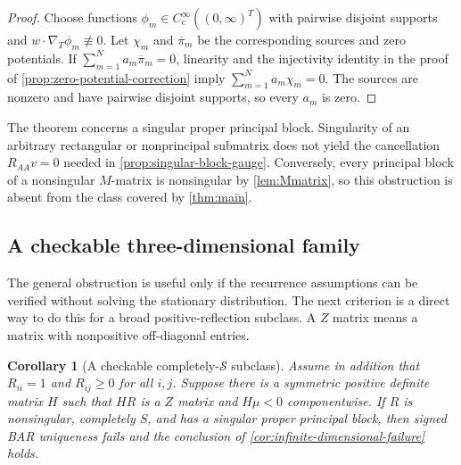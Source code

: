 \documentclass[aihp]{imsart}
\numberwithin{equation}{section}
\theoremstyle{plain}
\newtheorem{corollary}[corollary]{Corollary}
\theoremstyle{definition}
\newcommand{\1}{\mathbf 1}
\begin{document}
\begin{proof}
Choose functions $\phi_m\in C_c^\infty((0,\infty)^T)$ with pairwise disjoint supports and $w\cdot\nabla_T\phi_m\not\equiv0$. Let $\chi_m$ and $\overline\pi_m$ be the corresponding sources and zero potentials. If $\sum_{m=1}^N a_m\overline\pi_m=0$, linearity and the injectivity identity in the proof of \cref{prop:zero-potential-correction} imply $\sum_{m=1}^N a_m\chi_m=0$. The sources are nonzero and have pairwise disjoint supports, so every $a_m$ is zero.
\end{proof}

The theorem concerns a singular proper principal block. Singularity of an arbitrary rectangular or nonprincipal submatrix does not yield the cancellation $R_{AA}v=0$ needed in \cref{prop:singular-block-gauge}. Conversely, every principal block of a nonsingular $M$-matrix is nonsingular by \cref{lem:Mmatrix}, so this obstruction is absent from the class covered by \cref{thm:main}.

\subsection{A checkable three-dimensional family}

The general obstruction is useful only if the recurrence assumptions can be verified without solving the stationary distribution. The next criterion is a direct way to do this for a broad positive-reflection subclass. A $Z$ matrix means a matrix with nonpositive off-diagonal entries.

\begin{corollary}[A checkable completely-$\mathcal{S}$ subclass]\label{cor:checkable-completely-S}
Assume in addition that $R_{ii}=1$ and $R_{ij}\ge0$ for all $i,j$. Suppose there is a symmetric positive definite matrix $H$ such that $HR$ is a $Z$ matrix and $H\mu<0$ componentwise. If $R$ is nonsingular, completely $S$, and has a singular proper principal block, then signed BAR uniqueness fails and the conclusion of \cref{cor:infinite-dimensional-failure} holds.
\end{corollary}
\end{document}
